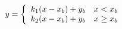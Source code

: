 \documentclass{article}
\begin{document}
\begin{equation}
  y=\left\{
    \begin{array}{cc}
      k_1(x-x_b)+y_b& x<x_b\\
      k_2(x-x_b)+y_b& x\geq x_b
    \end{array}
    \right .\notag
\end{equation}
\end{document}
